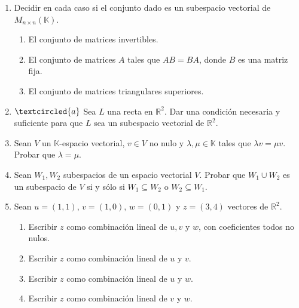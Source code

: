 \begin{enumerate}[resume, topsep=6pt, itemsep=.4cm]

\item\label{sub matrices} Decidir en cada caso si el conjunto dado es un subespacio vectorial de $M_{n\times n}(\mathbb{K})$.
\begin{enumerate}
    \item\label{sub matrices invertibles} El conjunto de matrices  invertibles.
    \item\label{sub matrices AB} El conjunto de matrices $A$ tales que $AB = BA$, donde $B$ es una matriz fija.
    \item\label{sub matrices triangulares} El conjunto de matrices triangulares superiores.
\end{enumerate}


\item\label{rectas} $\textcircled{a}$ Sea $L$ una recta en $\mathbb{R}^2$. Dar una condición necesaria y suficiente para que $L$ sea un subespacio vectorial de $\mathbb{R}^2$.


\item Sean $V$ un $\mathbb{K}$-espacio vectorial, $v\in V$ no nulo y $\lambda,\mu\in\mathbb{K}$ tales que $\lambda v=\mu v$. Probar que $\lambda=\mu$.


\item Sean $W_1, W_2$ subespacios de un espacio vectorial $V$. Probar que $W_1 \cup W_2$ es un subespacio
    de $V$ si y sólo si $W_1 \subseteq W_2$ o $W_2 \subseteq W_1$.
    

\item Sean $u=(1,1)$, $v=(1,0)$, $w=(0,1)$ y $z=(3,4)$ vectores de $\mathbb{R}^2$.
\begin{enumerate}
\item Escribir $z$ como combinación lineal de $u,v$ y $w$, con coeficientes todos no nulos.
\item Escribir $z$ como combinación lineal de $u$ y $v$.
\item Escribir $z$ como combinación lineal de $u$ y $w$.
\item Escribir $z$ como combinación lineal de $v$ y $w$.
\end{enumerate}


\end{enumerate}
